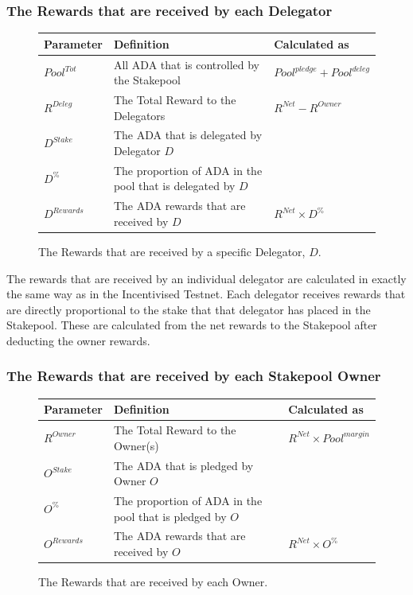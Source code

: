\documentclass[11pt,a4paper,dvipsnames,twosided,final]{article}
\newcommand{\ada}{ADA{}}
\begin{document}
\subsubsection*{The Rewards that are received by each Delegator}

\begin{figure}[h!]
\begin{center}
\begin{tabular}{||l|p{6cm}|l||}
  \hline \hline
\textbf{Parameter} & \textbf{Definition} & \textbf{Calculated as} \\\hline
${\textit{Pool}}^{Tot}$ & All \ada{} that is controlled by the Stakepool & ${\textit{Pool}}^\textit{pledge} + {\textit{Pool}}^\textit{deleg}$ \\\hline
$R^{Deleg}$ & The Total Reward to the Delegators & $R^{\textit{Net}} - R^\textit{Owner}$ \\\hline
$D^{Stake}$ & The \ada{} that is delegated by Delegator $D$ & \\\hline
$D^\%$ & The proportion of \ada{} in the pool that is delegated by $D$ & \\\hline
$D^{Rewards}$ & The \ada{} rewards that are received by $D$ & $R^{\textit{Net}} \times D^\%$ \\\hline
\hline
\end{tabular}
\end{center}
\caption{The Rewards that are received by a specific Delegator, $D$.}
\end{figure}

\noindent
The rewards that are received by an individual delegator are calculated in exactly the same way as in
the Incentivised Testnet.  Each delegator receives rewards that are directly proportional to the
stake that that delegator has placed in the Stakepool.  These are calculated from the net rewards to the
Stakepool after deducting the owner rewards.

\subsubsection*{The Rewards that are received by each Stakepool Owner}

\begin{figure}[h!]
\begin{center}
\begin{tabular}{||l|p{6cm}|l||}
  \hline \hline
\textbf{Parameter}  & \textbf{Definition} & \textbf{Calculated as} \\\hline
$R^\textit{Owner}$ & The Total Reward to the Owner(s) & $R^{\textit{Net}} \times {\textit{Pool}}^{\textit{margin}} $ \\\hline
$O^\textit{Stake}$ & The \ada{} that is pledged by Owner $O$ & \\\hline
$O^\%$ & The proportion of \ada{} in the pool that is pledged by $O$ & \\\hline
$O^{Rewards}$ & The \ada{} rewards that are received by $O$ & $R^{\textit{Net}} \times O^\%$ \\\hline
\hline
\end{tabular}
\end{center}
\caption{The Rewards that are received by each Owner.}
\end{figure}
\end{document}
